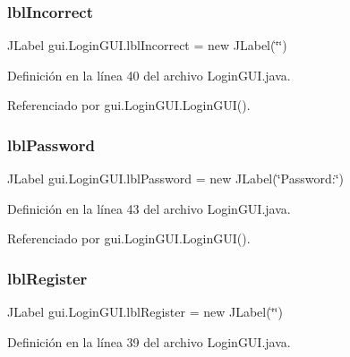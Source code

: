 \subsubsection{\texorpdfstring{lblIncorrect}{lblIncorrect}}
{\footnotesize\ttfamily J\+Label gui.\+Login\+G\+U\+I.\+lbl\+Incorrect = new J\+Label(\char`\"{}\char`\"{})\hspace{0.3cm}{\ttfamily [private]}}



Definición en la línea 40 del archivo Login\+G\+U\+I.\+java.



Referenciado por gui.\+Login\+G\+U\+I.\+Login\+G\+U\+I().

\mbox{\label{classgui_1_1_login_g_u_i_a72713a536f5f8ddc5690c23dd54c987a}} 
\subsubsection{\texorpdfstring{lblPassword}{lblPassword}}
{\footnotesize\ttfamily J\+Label gui.\+Login\+G\+U\+I.\+lbl\+Password = new J\+Label(\char`\"{}Password\+:\char`\"{})\hspace{0.3cm}{\ttfamily [private]}}



Definición en la línea 43 del archivo Login\+G\+U\+I.\+java.



Referenciado por gui.\+Login\+G\+U\+I.\+Login\+G\+U\+I().

\mbox{\label{classgui_1_1_login_g_u_i_a1dc66beb3e76f805a9d2ba6c39b896ca}} 
\subsubsection{\texorpdfstring{lblRegister}{lblRegister}}
{\footnotesize\ttfamily J\+Label gui.\+Login\+G\+U\+I.\+lbl\+Register = new J\+Label(\char`\"{}\char`\"{})\hspace{0.3cm}{\ttfamily [private]}}



Definición en la línea 39 del archivo Login\+G\+U\+I.\+java.



